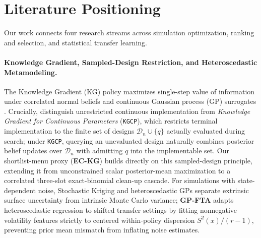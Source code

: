 \section{Literature Positioning}\label{sec:lit}

Our work connects four research streams across simulation optimization, ranking and selection, and statistical transfer learning.

\paragraph{Knowledge Gradient, Sampled-Design Restriction, and Heteroscedastic Metamodeling.}
The Knowledge Gradient (KG) policy maximizes single-step value of information under correlated normal beliefs \citep{frazier2008knowledge,frazier2009correlated} and continuous Gaussian process (GP) surrogates \citep{scott2011correlated}. Crucially, \citet{scott2011correlated} distinguish unrestricted continuous implementation from \emph{Knowledge Gradient for Continuous Parameters} (\texttt{KGCP}), which restricts terminal implementation to the finite set of designs $\mathcal{D}_n \cup \{q\}$ actually evaluated during search; under \texttt{KGCP}, querying an unevaluated design naturally combines posterior belief updates over $\mathcal{D}_n$ with admitting $q$ into the implementable set. Our shortlist-menu proxy (\textbf{EC-KG}) builds directly on this sampled-design principle, extending it from unconstrained scalar posterior-mean maximization to a correlated three-slot exact-binomial clean-up cascade. For simulations with state-dependent noise, Stochastic Kriging \citep{ankenman2010stochastic} and heteroscedastic GPs \citep{binois2018practical,binois2019replication,makarova2021risk} separate extrinsic surface uncertainty from intrinsic Monte Carlo variance; \textbf{GP-FTA} adapts heteroscedastic regression to shifted transfer settings by fitting nonnegative volatility features strictly to centered within-policy dispersion $S^2(x)/(r-1)$, preventing prior mean mismatch from inflating noise estimates.

